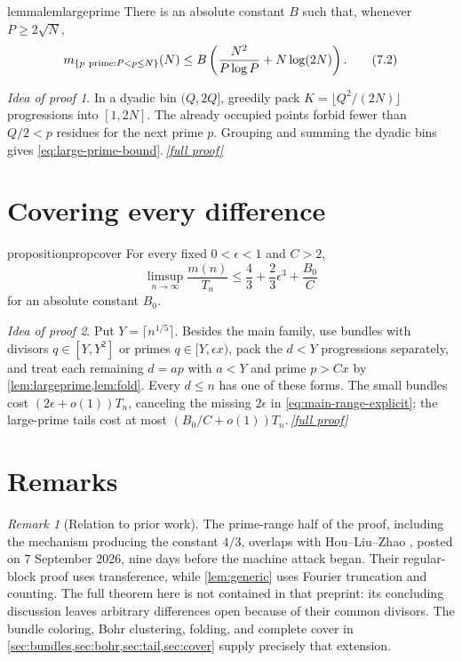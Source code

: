 \documentclass[11pt,a4paper]{article}
\theoremstyle{plain}
\theoremstyle{definition}
\theoremstyle{remark}
\newtheorem{remark}[theorem]{Remark}
\newtheorem*{proofidea}{Idea of proof}
\newcommand{\fullproofref}[1]{\,\hyperref[#1]{\textit{[full proof]}}}
\begin{document}
\begin{restatable}{lemma}{lemlargeprime}\label{lem:largeprime}
There is an absolute constant $B$ such that, whenever $P\ge2\sqrt N$,
\[
 m_{\{p\ {\rm prime}:P<p\le N\}}(N)
 \le B\left(\frac{N^2}{P\log P}+N\log(2N)\right).
\tag{7.2}\label{eq:large-prime-bound}
\]
\end{restatable}
\begin{proofidea}
In a dyadic bin $(Q,2Q]$, greedily pack $K=\lfloor Q^2/(2N)\rfloor$ progressions into $[1,2N]$. The already occupied points forbid fewer than $Q/2<p$ residues for the next prime $p$. Grouping and summing the dyadic bins gives \eqref{eq:large-prime-bound}.\fullproofref{pf:largeprime}
\end{proofidea}

\section{Covering every difference}\label{sec:cover}

\begin{restatable}{proposition}{propcover}\label{prop:cover}
For every fixed $0<\epsilon<1$ and $C>2$,
\[
 \limsup_{n\to\infty}\frac{m(n)}{T_n}
 \le\frac43+\frac23\epsilon^3+\frac{B_0}{C}
\tag{8.1}\label{eq:cover-bound}
\]
for an absolute constant $B_0$.
\end{restatable}
\begin{proofidea}
Put $Y=\lceil n^{1/5}\rceil$. Besides the main family, use bundles with divisors $q\in[Y,Y^2]$ or primes $q\in[Y,\epsilon x)$, pack the $d<Y$ progressions separately, and treat each remaining $d=ap$ with $a<Y$ and prime $p>Cx$ by \cref{lem:largeprime,lem:fold}. Every $d\le n$ has one of these forms. The small bundles cost $(2\epsilon+o(1))T_n$, canceling the missing $2\epsilon$ in \eqref{eq:main-range-explicit}; the large-prime tails cost at most $(B_0/C+o(1))T_n$.\fullproofref{pf:cover}
\end{proofidea}

\section{Remarks}\label{sec:remarks}

\begin{remark}[Relation to prior work]
The prime-range half of the proof, including the mechanism producing the constant $4/3$, overlaps with Hou--Liu--Zhao \cite{HLZ26}, posted on 7 September 2026, nine days before the machine attack began. Their regular-block proof uses transference, while \cref{lem:generic} uses Fourier truncation and counting. The full theorem here is not contained in that preprint: its concluding discussion leaves arbitrary differences open because of their common divisors. The bundle coloring, Bohr clustering, folding, and complete cover in \cref{sec:bundles,sec:bohr,sec:tail,sec:cover} supply precisely that extension.
\end{remark}
\end{document}
